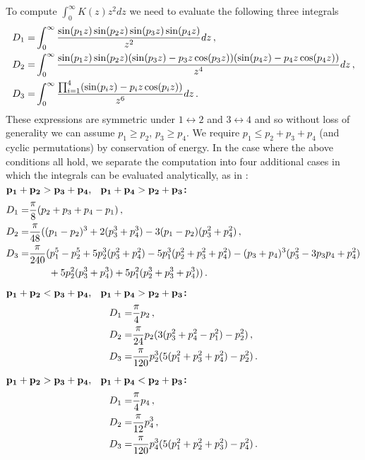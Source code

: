 To compute $\int_0^\infty K(z) z^2 dz$ we need to evaluate the following three integrals
\begin{align}
D_1=&\int_0^\infty \frac{\sin(p_1z)\sin(p_2z)\sin(p_3z)\sin(p_4z)}{z^2}dz\,,\\
D_2=&\int_0^\infty\frac{\sin(p_1z)\sin(p_2z)(\sin(p_3z)-p_3z\cos(p_3z))(\sin(p_4z)-p_4z\cos(p_4z))}{z^4}dz\,,\notag\\
D_3=&\int_0^\infty\frac{\prod_{i=1}^4(\sin(p_iz)-p_iz\cos(p_iz))}{z^6}dz\,.\notag
\end{align}
These expressions are symmetric under $1\leftrightarrow 2$ and $3\leftrightarrow 4$ and so without loss of generality we can assume $p_1\geq p_2$, $p_3\geq p_4$. We require $p_1\leq p_2+p_3+p_4$ (and cyclic permutations) by conservation of energy.  In the case where the above conditions all hold, we separate the computation into four additional cases in which the integrals can be evaluated analytically, as  in \cite{Dolgov:1997mb,Dolgov:1998sf}:\\
${\bf p_1+p_2>p_3+p_4\text{, \hspace{1mm} }p_1+p_4>p_2+p_3}${\bf :}
\begin{align}
D_1=&\frac{\pi}{8}(p_2+p_3+p_4-p_1)\,,\\
D_2=&\frac{\pi}{48}((p_1-p_2)^3+2(p_3^3+p_4^3)-3(p_1-p_2)(p_3^2+p_4^2)\,,\notag\\
D_3=&\frac{\pi}{240}(p_1^5-p_2^5+5p_2^3(p_3^2+p_4^2)-5p_1^3(p_2^2+p_3^2+p_4^2)-(p_3+p_4)^3(p_3^2-3p_3p_4+p_4^2)\notag\\
&\hspace{7mm}+5p_2^2(p_3^3+p_4^3)+5p_1^2(p_2^3+p_3^3+p_4^3))\,.\notag
\end{align}
${\bf p_1+p_2<p_3+p_4\text{, \hspace{1mm} }p_1+p_4>p_2+p_3}${\bf :}
\begin{align}
D_1=&\frac{\pi }{4}p_2\,,\\
D_2=&\frac{\pi }{24}p_2(3(p_3^2+p_4^2-p_1^2)-p_2^2)\,,\notag\\
D_3=&\frac{\pi}{120}p_2^3(5(p_1^2+p_3^2+p_4^2)-p_2^2)\,.\notag
\end{align}
${\bf p_1+p_2>p_3+p_4\text{, \hspace{1mm} }p_1+p_4<p_2+p_3}${\bf :}
\begin{align}
D_1=&\frac{\pi }{4}p_4\,,\\
D_2=&\frac{\pi}{12} p_4^3\,,\notag\\
D_3=&\frac{\pi }{120}p_4^3(5(p_1^2+p_2^2+p_3^2)-p_4^2)\,.\notag
\end{align}
